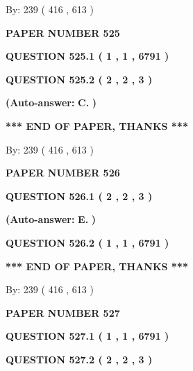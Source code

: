 \documentclass[12pt]{article}
\begin{document}
   
\hspace{1.0in} By: 
 239 ( 416 ,  613 )
   
   
   
   
\newpage 
\setcounter{page}{ 
   525001 } 
   
   
 {\textbf{ \Large{ PAPER NUMBER  525  }}}
   
   
   
   
  
  
{\textbf{\large{QUESTION
525.1 
 ( 1 , 1 , 6791 )
}}}
  
  
{\textbf{\large{QUESTION
525.2 
 ( 2 , 2 , 3 )
}}}
 
 
{\textbf{(Auto-answer:}}
{\textbf{\large{
C.}}}
{\textbf{)}}
 
 
   
   
   
   
\vspace{1.0in} 
{\textbf{\large{ *** END OF PAPER, THANKS *** }}} 
   
   
\hspace{1.0in} By: 
 239 ( 416 ,  613 )
   
   
   
   
\newpage 
\setcounter{page}{ 
   526001 } 
   
   
 {\textbf{ \Large{ PAPER NUMBER  526  }}}
   
   
   
   
  
  
{\textbf{\large{QUESTION
526.1 
 ( 2 , 2 , 3 )
}}}
 
 
{\textbf{(Auto-answer:}}
{\textbf{\large{
E.}}}
{\textbf{)}}
 
 
  
  
{\textbf{\large{QUESTION
526.2 
 ( 1 , 1 , 6791 )
}}}
   
   
   
   
\vspace{1.0in} 
{\textbf{\large{ *** END OF PAPER, THANKS *** }}} 
   
   
\hspace{1.0in} By: 
 239 ( 416 ,  613 )
   
   
   
   
\newpage 
\setcounter{page}{ 
   527001 } 
   
   
 {\textbf{ \Large{ PAPER NUMBER  527  }}}
   
   
   
   
  
  
{\textbf{\large{QUESTION
527.1 
 ( 1 , 1 , 6791 )
}}}
  
  
{\textbf{\large{QUESTION
527.2 
 ( 2 , 2 , 3 )
}}}
 
\end{document}
